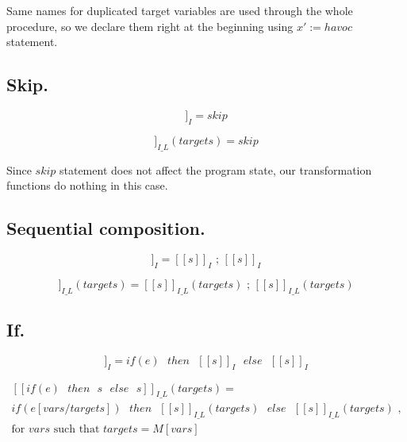 \documentclass[a4paper,12pt]{article}
\begin{document}
	Same names for duplicated target variables are used through the whole procedure, so we declare them right at the beginning using $x' := havoc$ statement.
		
	\subsection{Skip.}
	
	\begin{equation*}
		[[skip]]_{I} = skip 
	\end{equation*}

	\begin{equation*}
	[[skip]]_{I\_L}(targets) = skip 
	\end{equation*}
		
	Since $skip$ statement does not affect the program state,
	our transformation functions do nothing in this case.
	
	\subsection{Sequential composition.}
	
	\begin{equation*}
	[[s;s]]_{I} = [[s]]_{I} \text{ ; } [[s]]_{I}
	\end{equation*}

	\begin{equation*}
	[[s;s]]_{I\_L}(targets) = 
	[[s]]_{I\_L}(targets) 
	\text{ ; } [[s]]_{I\_L}(targets)
	\end{equation*}
		
	\subsection{If.}
	
	\begin{equation*}
	[[if(e) \text{ } 
	then \text{ } s  \text{ } 
	else \text{ } s]]_{I}
	=
	if(e) \text{ } 
	then \text{ } [[s]]_I \text{ } 
	else \text{ } [[s]]_I
	\end{equation*}
	
	\begin{equation*}
	\begin{multlined}
	[[if(e) \text{ } 
	then \text{ } s  \text{ } 
	else \text{ } s]]_{I\_L}(targets)
	= \\
	if(e[vars / targets]) \text{ } 
	then \text{ } [[s]]_{I\_L}(targets) \text{ } 
	else \text{ } [[s]]_{I\_L}(targets) \text{ ,} \\
	\text{for $vars$ such that } targets = M[vars]
	\end{multlined}
	\end{equation*}
	
\end{document}
